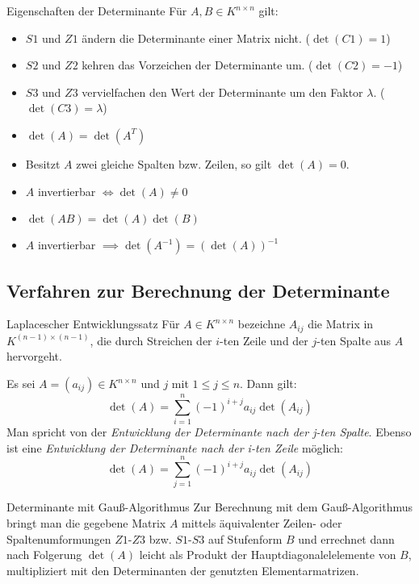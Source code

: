 \documentclass[german]{../spicker}
\begin{document}
\begin{defi}{Eigenschaften der Determinante}
    Für $A, B \in K^{n\times n}$ gilt:
    \begin{itemize}
        \item $S1$ und $Z1$ ändern die Determinante einer Matrix nicht. ($\det(C1) = 1$)
        \item $S2$ und $Z2$ kehren das Vorzeichen der Determinante um. ($\det(C2) = -1$)
        \item $S3$ und $Z3$ vervielfachen den Wert der Determinante um den Faktor $\lambda$. ($\det(C3) = \lambda$)
    \end{itemize}

    \begin{itemize}
        \item $\det(A) = \det(A^T)$
        \item Besitzt $A$ zwei gleiche Spalten bzw. Zeilen, so gilt $\det(A) = 0$.
        \item $A$ invertierbar $\iff \det(A) \neq 0$
        \item $\det(AB) = \det(A)\det(B)$
        \item $A$ invertierbar $\implies \det(A^{-1}) = (\det(A))^{-1}$
    \end{itemize}
\end{defi}

\subsection{Verfahren zur Berechnung der Determinante}

\begin{defi}{Laplacescher Entwicklungssatz}
    Für $A \in K^{n\times n}$ bezeichne $A_{ij}$ die Matrix in $K^{(n-1)\times (n-1)}$, die durch Streichen der $i$-ten Zeile und der $j$-ten Spalte aus $A$ hervorgeht.

    Es sei $A = (a_{ij}) \in K^{n\times n}$ und $j$ mit $1 \leq j \leq n$.
    Dann gilt:
    $$
        \det(A) = \sum^n_{i=1} (-1)^{i+j} a_{ij}\det(A_{ij})
    $$
    Man spricht von der \emph{Entwicklung der Determinante nach der j-ten Spalte}.
    Ebenso ist eine \emph{Entwicklung der Determinante nach der i-ten Zeile} möglich:
    $$
        \det(A) = \sum^n_{j=1} (-1)^{i+j} a_{ij}\det(A_{ij})
    $$
\end{defi}

\begin{defi}{Determinante mit Gauß-Algorithmus}
    Zur Berechnung mit dem Gauß-Algorithmus bringt man die gegebene Matrix $A$ mittels äquivalenter Zeilen- oder Spaltenumformungen $Z1$-$Z3$ bzw. $S1$-$S3$ auf Stufenform $B$ und errechnet dann nach Folgerung $\det(A)$ leicht als Produkt der Hauptdiagonalelelemente von $B$, multipliziert mit den Determinanten der genutzten Elementarmatrizen.
\end{defi}
\end{document}
